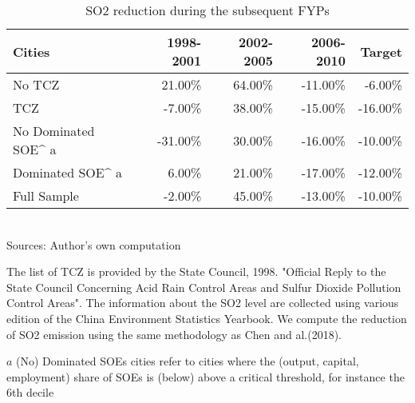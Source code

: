 \documentclass[12pt]{article}
\begin{document}
\begin{table}\centering
\caption{SO2 reduction during the subsequent FYPs}
\label{table_1}
\begin{adjustbox}{width=\textwidth, totalheight=\baselineskip,keepaspectratio}
\begin{tabular}{lrrrr}
\toprule
             Cities &  1998-2001 &  2002-2005 &  2006-2010 &  Target \\
\midrule
             No TCZ &     21.00\% &     64.00\% &    -11.00\% &  -6.00\% \\
                TCZ &     -7.00\% &     38.00\% &    -15.00\% & -16.00\% \\
 No Dominated SOE^ a &    -31.00\% &     30.00\% &    -16.00\% & -10.00\% \\
    Dominated SOE^ a &      6.00\% &     21.00\% &    -17.00\% & -12.00\% \\
        Full Sample &     -2.00\% &     45.00\% &    -13.00\% & -10.00\% \\
\bottomrule
\end{tabular}
\end{adjustbox}
\begin{tablenotes} 
 \small 
 \item \\ 

Sources: Author's own computation \ 

The list of TCZ is provided by the State Council, 1998.
"Official Reply to the State Council Concerning Acid Rain Control Areas
and Sulfur Dioxide Pollution Control Areas".
The information about the SO2 level are collected using various edition
of the China Environment Statistics Yearbook.
We compute the reduction of SO2 emission using the same methodology
as Chen and al.(2018). \ 

$a$ (No) Dominated SOEs cities refer to cities where the 
(output, capital, employment) share of SOEs is (below) above a critical threshold,
for instance the 6th decile
 
\end{tablenotes}
\end{table}
\end{document}
